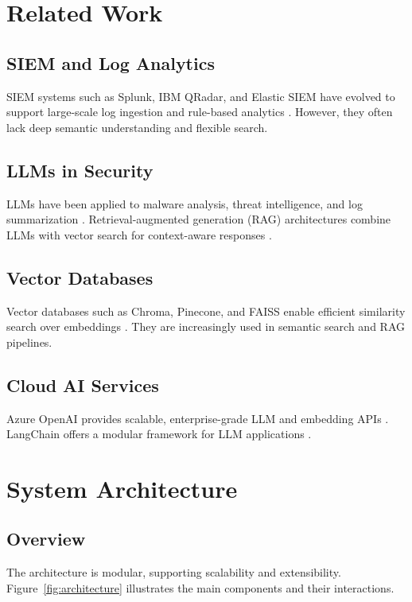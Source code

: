 \documentclass{article}
\begin{document}
\section{Related Work}
\subsection{SIEM and Log Analytics}
SIEM systems such as Splunk, IBM QRadar, and Elastic SIEM have evolved to support large-scale log ingestion and rule-based analytics \cite{siem_survey, splunk, qradar}. However, they often lack deep semantic understanding and flexible search.

\subsection{LLMs in Security}
LLMs have been applied to malware analysis, threat intelligence, and log summarization \cite{llm_security, gpt_malware}. Retrieval-augmented generation (RAG) architectures combine LLMs with vector search for context-aware responses \cite{rag_survey}.

\subsection{Vector Databases}
Vector databases such as Chroma, Pinecone, and FAISS enable efficient similarity search over embeddings \cite{vector_db, pinecone, faiss}. They are increasingly used in semantic search and RAG pipelines.

\subsection{Cloud AI Services}
Azure OpenAI provides scalable, enterprise-grade LLM and embedding APIs \cite{azure_openai}. LangChain offers a modular framework for LLM applications \cite{langchain}.

\section{System Architecture}
\subsection{Overview}
The architecture is modular, supporting scalability and extensibility. Figure~\ref{fig:architecture} illustrates the main components and their interactions.
\end{document}
